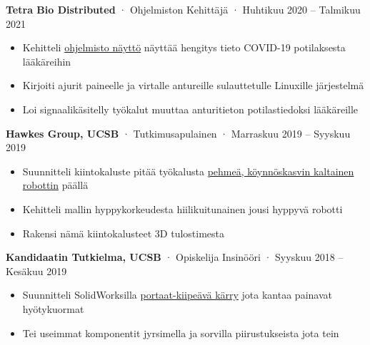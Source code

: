 \documentclass[12pt, oneside]{article}
\newcommand{\jobtitle}[3] {
	{\bf #1} · {#2} · {#3} \vspace{-7pt} \\
}
\begin{document}
\begin{flushleft}
\jobtitle{Tetra Bio Distributed}{Ohjelmiston Kehittäjä}{Huhtikuu 2020 – Talmikuu 2021}
\begin{itemize}
	\item Kehitteli \href{https://github.com/tetrabiodistributed/project-tetra-display}{ohjelmisto näyttö} näyttää hengitys tieto COVID-19 potilaksesta lääkäreihin \\
	\item Kirjoiti ajurit paineelle ja virtalle antureille sulauttetulle Linuxille järjestelmä \\
	\item Loi signaalikäsitelly työkalut muuttaa anturitieton potilastiedoksi lääkäreille \\
\end{itemize}

\jobtitle{Hawkes Group, UCSB}{Tutkimusapulainen}{Marraskuu 2019 – Syyskuu 2019}
\begin{itemize}
	\item Suunnitteli kiintokaluste pitää työkalusta \href{https://portfolium.com/entry/vine-robot-tool-mount}{pehmeä, köynnöskasvin kaltainen robottin} päällä \\
	\item Kehitteli mallin hyppykorkeudesta hiilikuitunainen jousi hyppyvä robotti \\
	\item Rakensi nämä kiintokalusteet 3D tulostimesta  \\
\end{itemize}

\jobtitle{Kandidaatin Tutkielma, UCSB}{Opiskelija Insinööri}{Syyskuu 2018 – Kesäkuu 2019}
\begin{itemize}
	\item Suunnitteli SolidWorksilla \href{https://portfolium.com/entry/automatic-stair-climbing-vehicle}{portaat-kiipeävä kärry} jota kantaa painavat hyötykuormat \\
	\item Tei useimmat komponentit jyrsimella ja sorvilla piirustukseista jota tein \\
\end{itemize}


\end{flushleft}
\end{document}
